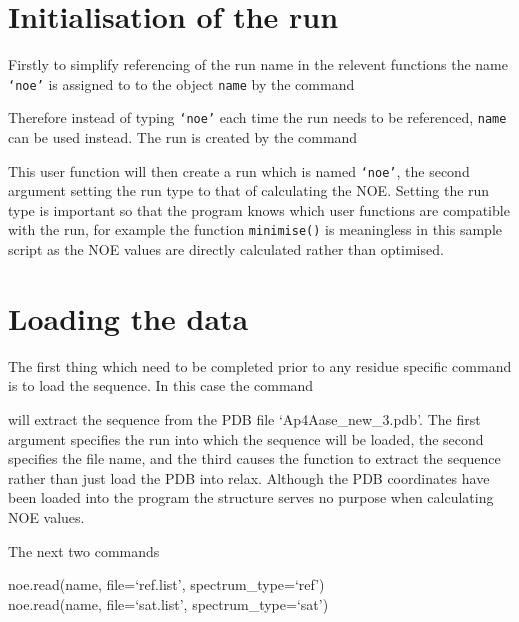 
\section{Initialisation of the run} \label{NOE initialisation}

Firstly to simplify referencing of the run name in the relevent functions the name \texttt{`noe'} is assigned to to the object \texttt{name} by the command


Therefore instead of typing \texttt{`noe'} each time the run needs to be referenced, \texttt{name} can be used instead.  The run is created by the command


This user function will then create a run which is named \texttt{`noe'}, the second argument setting the run type to that of calculating the NOE.  Setting the run type is important so that the program knows which user functions are compatible with the run, for example the function \texttt{minimise()} is meaningless in this sample script as the NOE values are directly calculated rather than optimised.




\section{Loading the data}

The first thing which need to be completed prior to any residue specific command is to load the sequence.  In this case the command


will extract the sequence from the PDB file `Ap4Aase\_new\_3.pdb'.  The first argument specifies the run into which the sequence will be loaded, the second specifies the file name, and the third causes the function to extract the sequence rather than just load the PDB into relax.  Although the PDB coordinates have been loaded into the program the structure serves no purpose when calculating NOE values.

The next two commands

\begin{exampleenv}
noe.read(name, file=`ref.list', spectrum\_type=`ref') \\
noe.read(name, file=`sat.list', spectrum\_type=`sat')
\end{exampleenv}

